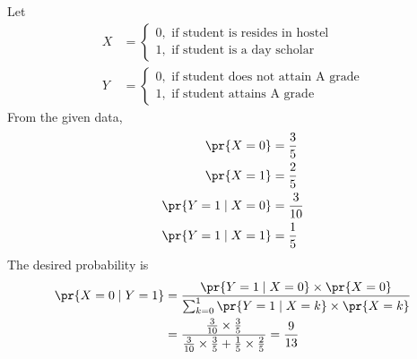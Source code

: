 Let 
\begin{align}
	X &=  \begin{cases}
     0, \text{ if student is resides in hostel}\\
     1, \text{ if student is a day scholar} 
 \end{cases}\\
	Y &=  \begin{cases}
     0, \text{ if student does not attain A grade}\\
     1, \text{ if student attains A grade} 
 \end{cases}
\end{align}
From the given data, 
\begin{align}
	\pr{X=0} &= \frac{3}{5}\\
	\pr{X=1} &= \frac{2}{5}\\
	\pr{Y=1 \mid X=0} &= \frac{3}{10}\\
	\pr{Y=1 \mid X=1} &= \frac{1}{5}
\end{align}
 The desired probability is
 \begin{align}
	 \pr{X=0 \mid Y=1} &= \frac{\pr{Y=1 \mid X=0}\times\pr{X=0}}{\sum_{k=0}^{1}\pr{Y=1 \mid X=k}\times\pr{X=k} }\\
 	&= \frac{\frac{3}{10}\times\frac{3}{5}}{\frac{3}{10}\times\frac{3}{5} + \frac{1}{5}\times\frac{2}{5}}
 	= \frac{9}{13}
 \end{align}

